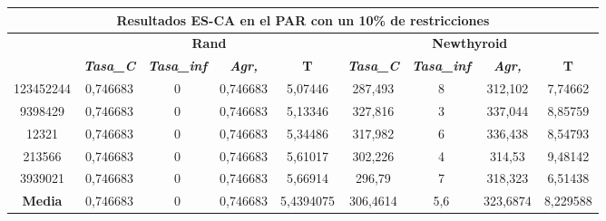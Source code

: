 \documentclass[12pt, spanish]{article}
\begin{document}
\begin{table}[H]
\begin{tabular}{|c|c|c|c|c|c|c|c|c|}
\hline
\multicolumn{9}{|c|}{\textbf{Resultados ES-CA en el PAR con un 10\% de restricciones}}                                                                                                                            \\ \hline
\multirow{2}{*}{} & \multicolumn{4}{c|}{\textbf{Rand}}                                                            & \multicolumn{4}{c|}{\textbf{Newthyroid}}                                                      \\ \cline{2-9} 
                  & \textit{\textbf{Tasa\_C}} & \textit{\textbf{Tasa\_inf}} & \textit{\textbf{Agr,}} & \textbf{T} & \textit{\textbf{Tasa\_C}} & \textit{\textbf{Tasa\_inf}} & \textit{\textbf{Agr,}} & \textbf{T} \\ \hline
123452244         & 0,746683                  & 0                           & 0,746683               & 5,07446    & 287,493                   & 8                           & 312,102                & 7,74662    \\ \hline
9398429           & 0,746683                  & 0                           & 0,746683               & 5,13346    & 327,816                   & 3                           & 337,044                & 8,85759    \\ \hline
12321             & 0,746683                  & 0                           & 0,746683               & 5,34486    & 317,982                   & 6                           & 336,438                & 8,54793    \\ \hline
213566            & 0,746683                  & 0                           & 0,746683               & 5,61017    & 302,226                   & 4                           & 314,53                 & 9,48142    \\ \hline
3939021           & 0,746683                  & 0                           & 0,746683               & 5,66914    & 296,79                    & 7                           & 318,323                & 6,51438    \\ \hline
\textbf{Media}    & 0,746683                  & 0                           & 0,746683               & 5,4394075  & 306,4614                  & 5,6                         & 323,6874               & 8,229588   \\ \hline
\end{tabular}
\end{table}
\end{document}
